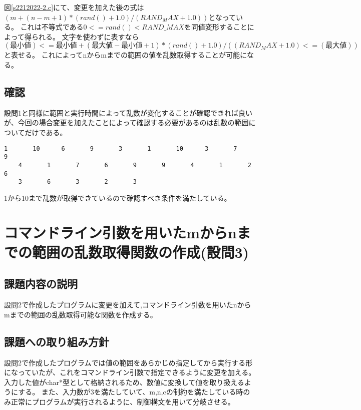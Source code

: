 \documentclass[fontsize = 10pt, paper= a4]{jlreq}
\begin{document}
図\ref{s2212022-2.c}にて、変更を加えた後の式は$(m + (n - m + 1)* (rand()+1.0) / (RAND_MAX+1.0))$となっている。
これは不等式である$ 0 <= rand() < RAND\_MAX $を同値変形することによって得られる。
文字を使わずに表すなら$(最小値)<= 最小値 + (最大値-最小値 + 1)*(rand() + 1.0)/((RAND_MAX+1.0) <= (最大値))$と表せる。
これによってnからmまでの範囲の値を乱数取得することが可能になる。

\subsection{確認}
設問1と同様に範囲と実行時間によって乱数が変化することが確認できれば良いが、今回の場合変更を加えたことによって確認する必要があるのは乱数の範囲についてだけである。
\begin{lstlisting}[basicstyle=\ttfamily\footnotesize, frame=single, caption=s2212022-2.out ,label=s2212022-2.out]
    1       10      6       9       3       1       10      3       7       9       
    4       1       7       6       9       9       4       1       2       6       
    3       6       3       2       3
\end{lstlisting}

1から10まで乱数が取得できているので確認すべき条件を満たしている。

\section{コマンドライン引数を用いたmからnまでの範囲の乱数取得関数の作成(設問3)}
\subsection{課題内容の説明}
設問2で作成したプログラムに変更を加えて,コマンドライン引数を用いたnからmまでの範囲の乱数取得可能な関数を作成する。
\subsection{課題への取り組み方針}
設問2で作成したプログラムでは値の範囲をあらかじめ指定してから実行する形になっていたが、これをコマンドライン引数で指定できるように変更を加える。
入力した値がchar*型として格納されるため、数値に変換して値を取り扱えるようにする。
また、入力数が3を満たしていて、m,n,cの制約を満たしている時のみ正常にプログラムが実行されるように、制御構文を用いて分岐させる。
\end{document}
